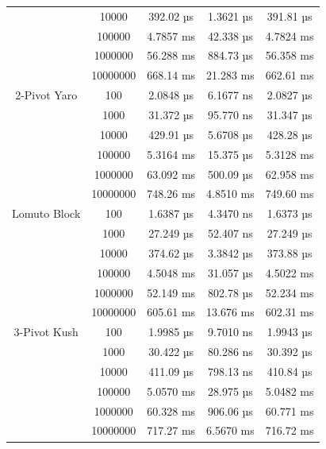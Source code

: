 \documentclass{article}
\begin{document}
\begin{center}
\begin{tabular}{ |c c | c c c| }
                        & 10000    & 392.02 µs    & 1.3621 µs   & 391.81 µs \\
                        & 100000   & 4.7857 ms    & 42.338 µs   & 4.7824 ms \\
                        & 1000000  & 56.288 ms    & 884.73 µs   & 56.358 ms \\
                        & 10000000 & 668.14 ms    & 21.283 ms   & 662.61 ms \\
        \hline
        2-Pivot Yaro    & 100      & 2.0848 µs    & 6.1677 ns   & 2.0827 µs \\
                        & 1000     & 31.372 µs    & 95.770 ns   & 31.347 µs \\
                        & 10000    & 429.91 µs    & 5.6708 µs   & 428.28 µs \\
                        & 100000   & 5.3164 ms    & 15.375 µs   & 5.3128 ms \\
                        & 1000000  & 63.092 ms    & 500.09 µs   & 62.958 ms \\
                        & 10000000 & 748.26 ms    & 4.8510 ms   & 749.60 ms \\
        Lomuto Block    & 100      & 1.6387 µs    & 4.3470 ns   & 1.6373 µs \\
                        & 1000     & 27.249 µs    & 52.407 ns   & 27.249 µs \\
                        & 10000    & 374.62 µs    & 3.3842 µs   & 373.88 µs \\
                        & 100000   & 4.5048 ms    & 31.057 µs   & 4.5022 ms \\
                        & 1000000  & 52.149 ms    & 802.78 µs   & 52.234 ms \\
                        & 10000000 & 605.61 ms    & 13.676 ms   & 602.31 ms \\
        \hline
        3-Pivot Kush    & 100      & 1.9985 µs    & 9.7010 ns   & 1.9943 µs \\
                        & 1000     & 30.422 µs    & 80.286 ns   & 30.392 µs \\
                        & 10000    & 411.09 µs    & 798.13 ns   & 410.84 µs \\
                        & 100000   & 5.0570 ms    & 28.975 µs   & 5.0482 ms \\
                        & 1000000  & 60.328 ms    & 906.06 µs   & 60.771 ms \\
                        & 10000000 & 717.27 ms    & 6.5670 ms   & 716.72 ms \\

\end{tabular}
\end{center}
\end{document}
